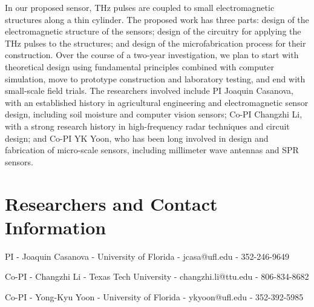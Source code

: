 \documentclass[11pt,letterpaper]{article}
\begin{document}
In our proposed sensor, THz pulses are coupled to small electromagnetic structures along a thin cylinder. The proposed work has three parts: design of the electromagnetic structure of the sensors; design of the circuitry for applying the THz pulses to the structures; and design of the microfabrication process for their construction. Over the course of a two-year investigation, we plan to start with theoretical design using fundamental principles combined with computer simulation, move to prototype construction and laboratory testing, and end with small-scale field trials. The researchers involved include PI Joaquin Casanova, with an established history in agricultural engineering and electromagnetic sensor design, including soil moisture and computer vision sensors; Co-PI Changzhi Li, with a strong research history in high-frequency radar techniques and circuit design; and Co-PI YK Yoon, who has been long involved in design and fabrication of micro-scale sensors, including millimeter wave antennas and SPR sensors. 

\section*{Researchers and Contact Information}
\begin{description}
\item{PI} - Joaquin Casanova - University of Florida - jcasa@ufl.edu - 352-246-9649
\item{Co-PI} - Changzhi Li - Texas Tech University - changzhi.li@ttu.edu - 806-834-8682
\item{Co-PI} - Yong-Kyu Yoon -  University of Florida - ykyoon@ufl.edu  - 352-392-5985
\end{description}



  
  
\end{document}
